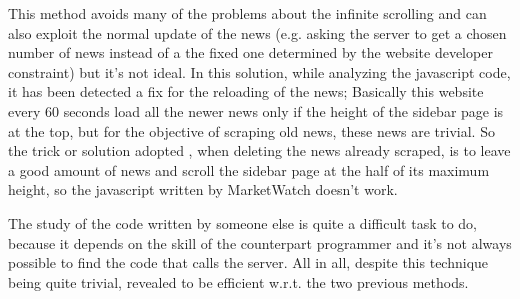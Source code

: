 This method avoids many of the problems about the infinite scrolling and can also exploit the normal update of the news (e.g. asking the server to get a chosen number of news instead of a the fixed one determined by the website developer constraint) but it's not ideal. 
In this solution, while analyzing the javascript code, it has been detected a fix for the reloading of the news; Basically this website every 60 seconds load all the newer news only if the height of the sidebar page is at the top, but for the objective of scraping old news, these news are trivial. So the trick or solution adopted , when deleting the news already scraped, is to leave a good amount of news and scroll the sidebar page at the half of its maximum height, so the javascript written by MarketWatch doesn't work.
\par
The study of the code written by someone else is quite a difficult task to do, because it depends on the skill of the counterpart programmer and it's not always possible to find the code that calls the server. All in all, despite this technique being quite trivial, revealed to be efficient w.r.t. the two previous methods.
\par
